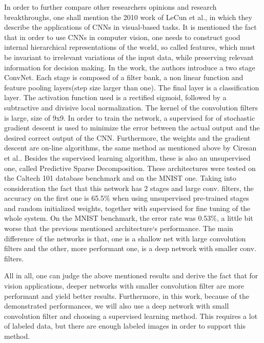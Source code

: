 \documentclass[12pt,a4paper,twoside]{report}
\begin{document}
In order to further compare other researchers opinions and research breakthroughs, one shall mention the 2010 work of LeCun et al.\cite{article-lecuncnn}, in which they describe the applications of CNNs in visual-based tasks. It is mentioned the fact that in order to use CNNs in computer vision, one needs to construct good internal hierarchical representations of the world, so called features, which must be invariant to irrelevant variations of the input data, while preserving relevant information for decision making. In the work, the authors introduce a two stage ConvNet. Each stage is composed of a filter bank, a non linear function and feature pooling layers(step size larger than one). The final layer is a classification layer. The activation function used is a rectified sigmoid, followed by a subtractive and divisive local normalization. The kernel of the convolution filters is large, size of 9x9. In order to train the network, a supervised for of stochastic gradient descent is used to minimize the error between the actual output and the desired correct output of the CNN. Furthermore, the weights and the gradient descent are on-line algorithms, the same method as mentioned above by Ciresan et al.\cite{article-ciresan}. Besides the supervised learning algorithm, these is also an unsupervised one, called Predictive Sparse Decomposition. These architectures were tested on the Caltech 101 database benchmark and on the MNIST one. Taking into consideration the fact that this network has 2 stages and large conv. filters, the accuracy on the first one is 65.5\% when using unsupervised pre-trained stages and random initialized weights, together with supervised for fine tuning of the whole system. On the MNIST benchmark, the error rate was 0.53\%, a little bit worse that the previous mentioned architecture`s performance. The main difference of the networks is that, one is a shallow net with large convolution filters and the other, more performant one, is a deep network with smaller conv. filters.\par
All in all, one can judge the above mentioned results and derive the fact that for vision applications, deeper networks with smaller convolution filter are more performant and yield better results\cite{article-vgg}\cite{book-deeplearning}. Furthermore, in this work, because of the demonstrated performances, we will also use a deep network with small convolution filter and choosing a supervised learning method. This requires a lot of labeled data, but there are enough labeled images in order to support this method.\par
\end{document}
